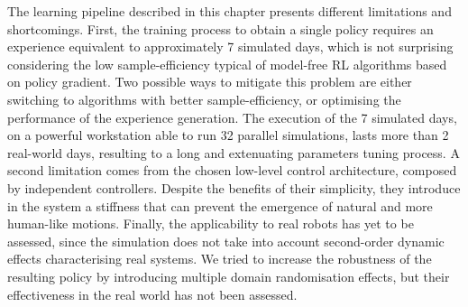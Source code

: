 The learning pipeline described in this chapter presents different limitations and shortcomings.
First, the training process to obtain a single policy requires an experience equivalent to approximately 7 simulated days, which is not surprising considering the low sample-efficiency typical of model-free \ac{RL} algorithms based on policy gradient.
Two possible ways to mitigate this problem are either switching to algorithms with better sample-efficiency, or optimising the performance of the experience generation.
The execution of the 7 simulated days, on a powerful workstation able to run 32 parallel simulations, lasts more than 2 real-world days, resulting to a long and extenuating parameters tuning process.
A second limitation comes from the chosen low-level control architecture, composed by independent \pid controllers.
Despite the benefits of their simplicity, they introduce in the system a stiffness that can prevent the emergence of natural and more human-like motions.
Finally, the applicability to real robots has yet to be assessed, since the simulation does not take into account second-order dynamic effects characterising real systems.
We tried to increase the robustness of the resulting policy by introducing multiple domain randomisation effects, but their effectiveness in the real world has not been assessed.
